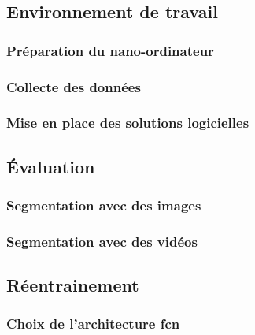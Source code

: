\subsection{Environnement de travail}

\subsubsection{Préparation du nano-ordinateur}
\label{preparation_nano_ordinateur}
\subsubsection{Collecte des données}
\label{section:collecte_donnees}
\subsubsection{Mise en place des solutions logicielles}

\subsection{Évaluation}

\subsubsection{Segmentation avec des images}

\subsubsection{Segmentation avec des vidéos}

\subsection{Réentrainement}

\subsubsection{Choix de l'architecture \acrshort{fcn}}
\label{section:choix_modele_architecture}
% 
% 